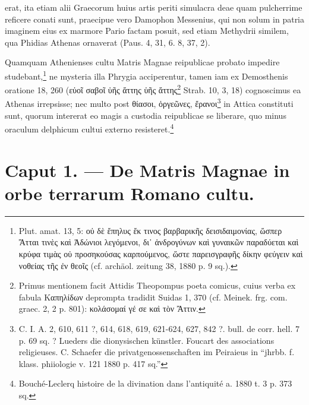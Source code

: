 \documentclass[a4paper, 11pt, oneside, polutonikogreek, german, twocolumn]{article}
\begin{document}
erat, ita etiam alii Graecorum huius artis periti simulacra deae quam pulcherrime reficere conati sunt, praecipue vero Damophon Messenius, qui non solum in patria imaginem eius ex marmore Pario factam posuit, sed etiam Methydrii similem, qua Phidias Athenas ornaverat (Paus. 4, 31, 6. 8, 37, 2).

Quamquam Athenienses cultu Matris Magnae reipublicae probato impedire studebant,\footnote{Plut. amat. 13, 5: οὐ δὲ ἔπηλυς ἔκ τινος βαρβαρικῆς δεισιδαιμονίας, ὥσπερ Ἄτται τινὲς καὶ Ἀδώνιοι λεγόμενοι, δι᾽ ἀνδρογύνων καὶ γυναικῶν παραδύεται καὶ κρύφα τιμὰς οὐ προσηκούσας καρπούμενος, ὥστε παρεισγραφῆς δίκην φεύγειν καὶ νοθείας τῆς ἐν θεοῖς (cf. archäol. zeitung 38, 1880 p. 9 sq.).} ne mysteria illa Phrygia acciperentur, tamen iam ex Demosthenis oratione 18, 260 (εὐοῖ σαβοῖ ὑῆς ἄττης ὑῆς ἄττης\footnote{Primus mentionem facit Attidis Theopompus poeta comicus, cuius verba ex fabula Καπηλίδων deprompta tradidit Suidas 1, 370 (cf. Meinek. frg. com. graec. 2, 2 p. 801): κολάσομαί γέ σε καὶ τὸν Ἄττιν.} Strab. 10, 3, 18) cognoscimus ea Athenas irrepsisse; nec multo post θίασοι, ὀργεῶνες, ἔρανοι\footnote{C. I. A. 2, 610, 611 ?, 614, 618, 619, 621-624, 627, 842 ?. bull. de corr. hell. 7 p. 69 sq. ? Lueders die dionysischen künstler. Foucart des associations religieuses. C. Schaefer die privatgenossenschaften im Peiraieus in "`jhrbb. f. klass. phiiologie v. 121 1880 p. 417 sq."'} in Attica constituti sunt, quorum intererat eo magis a custodia reipublicae se liberare, quo minus oraculum delphicum cultui externo resisteret.\footnote{Bouché-Leclerq histoire de la divination dans l'antiquité a. 1880 t. 3 p. 373 sq.}
\clearpage
\section{Caput 1. --- De Matris Magnae in orbe terrarum Romano cultu.}
\end{document}

